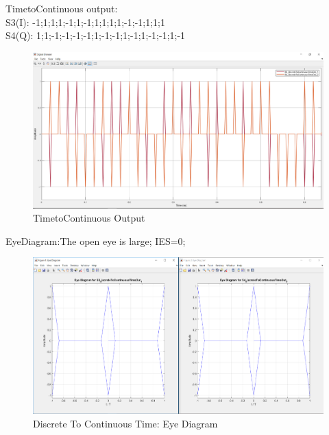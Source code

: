 TimetoContinuous output:\\
S3(I): -1;1;1;1;-1;1;-1;1;1;1;1;-1;-1;1;1;1\\
S4(Q): 1;1;-1;-1;-1;-1;1;-1;-1;1;-1;1;-1;-1;1;-1\\
	
	\begin{figure}[h]
	\centering
	\includegraphics[width=1\textwidth]{../lib/discrete_to_continuous_time/figures/S3_S4.pdf}
	\caption{TimetoContinuous Output}\label{fig:TimetoContinuous Output}
\end{figure}

EyeDiagram:The open eye is large; IES=0;\\
	\begin{figure}[h]
	\centering
	\includegraphics[width=1\textwidth]{../lib/discrete_to_continuous_time/figures/S3_S4_eye.pdf}
	\caption{Discrete To Continuous Time: Eye Diagram}\label{fig:TimetoContinuous : Eye Diagram}
\end{figure}

	
	
	


\pagebreak
